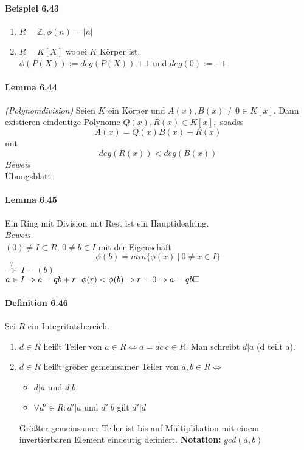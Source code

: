 \documentclass{scrartcl}
\begin{document}
\paragraph{Beispiel 6.43}
\begin{enumerate}
\item $R = \mathbb{Z}, \phi(n) = |n|$
\item $R = K[X]$ wobei $K$ Körper ist. \\
  $\phi(P(X)) := deg(P(X)) + 1$ und $deg(0) := -1$
\end{enumerate}

\paragraph{Lemma 6.44} \textit{(Polynomdivision)}
Seien $K$ ein Körper und $A(x),B(x) \neq 0 \in K[x]$. Dann existieren eindeutige
Polynome $Q(x), R(x) \in K[x],$ soadss
\[
  A(x) = Q(x)B(x) + R(x)
\]
mit
\[
  deg(R(x)) < deg(B(x))
\]
\textit{Beweis} \\
Übungsblatt

\paragraph{Lemma 6.45}
Ein Ring mit Division mit Rest ist ein Hauptidealring. \\
\textit{Beweis} \\
$(0) \neq I \subset R$, $0 \neq b \in I$ mit der Eigenschaft
\[
  \phi(b) = min\{\phi(x) ~|~ 0 \neq x \in I\}
\]
$\overset{?}{\Rightarrow}$ $I = (b)$ \\
$a \in I \Rightarrow a = qb + r ~~ \phi(r) < \phi(b) \Rightarrow r = 0
\Rightarrow a = qb \hfill \square$

\paragraph{Definition 6.46}
Sei $R$ ein Integritätsbereich.
\begin{enumerate}
\item $d \in R$ heißt Teiler von $a \in R \Leftrightarrow a = dc ~ c \in R$.
  Man schreibt $d|a$ (d teilt a).
\item $d \in R$ heißt größer gemeinsamer Teiler von $a,b \in R \Leftrightarrow$
  \begin{itemize}
  \item $d|a$ und $d|b$
  \item $\forall d' \in R: d'|a$ und $d'|b$ gilt $d'|d$
  \end{itemize}
  Größter gemeinsamer Teiler ist bis auf Multiplikation mit einem invertierbaren
  Element eindeutig definiert.
  \textbf{Notation:} $gcd(a,b)$
\end{enumerate}
\end{document}
